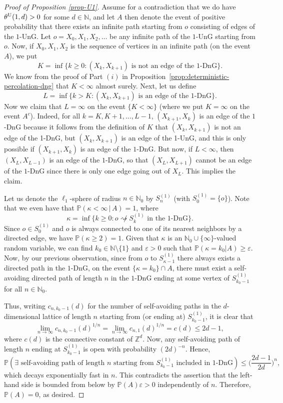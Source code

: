 \documentclass[a4paper, oneside, 11pt]{amsart}
\newcommand{\N}{\mathbb{N}}
\theoremstyle{definition}
\renewcommand{\P}{\mathbb{P}}
\newcommand{\1}{\mathbbm{1}}
\newcommand{\0}{\mathbf{o}}
\newcommand{\Z}{\mathbb{Z}}
\numberwithin{equation}{section}
\begin{document}
\begin{proof}[Proof of Proposition \ref{prop-U1}]
    Assume for a contradiction that we do have $\theta^{\rm U}(1,d)>0$ for some $d \in \N$, and let $A$ then denote the event of positive probability that there exists an infinite path starting from $o$ consisting of edges of the $1$-UnG. %
Let $o=X_0,X_1,X_2,\ldots$ be any infinite path of the $1$-UnG starting from $o$.
Now, if $X_0,X_1,X_2$ is the sequence of vertices in an infinite path (on the event $A$), we put
\[ K=\inf \{ k \geq 0 \colon (X_k,X_{k+1}) \text{ is not an edge of the $1$-DnG} \}. \]
We know from the proof of Part $(i)$ in Proposition~\ref{prop:deterministic-percolation-dng} that $K<\infty$ almost surely. Next, let us define
\[ L=\inf \{ k > K \colon 
(X_{k},X_{k+1})\text{ is an edge of the 1-DnG}\}. \]
Now we claim that $L=\infty$ on the event $\{ K<\infty\}$ (where we put $K=\infty$ on the event $A^c$). Indeed, for all $k=K,K+1,\ldots,L-1$, $(X_{k+1},X_k)$ is an edge of the $1$-DnG because it follows from the definition of $K$ that $(X_{k},X_{k+1})$ is not an edge of the 1-DnG, but $(X_k,X_{k+1})$ is an edge of the 1-UnG, and this is only possible if $(X_{k+1},X_k)$ is an edge of the $1$-DnG. But now, if $L<\infty$, then $(X_{L},X_{L-1})$ is an edge of the $1$-DnG, so that $(X_{L},X_{L+1})$ cannot be an edge of the $1$-DnG since there is only one edge going out of $X_L$. This implies the claim.

Let us denote the $\ell_1$-sphere of radius $n\in\N_0$ by $S^{(1)}_n$ (with $S^{(1)}_0=\{o\}$). Note that we even have that $\P(\kappa<\infty\,|\,A)=1$, where
\[ \kappa = \inf \big\{ k \geq 0 \colon o \not\rightsquigarrow S^{(1)}_k \text{ in the $1$-DnG} \big\}. \]
Since $o \in S_0^{(1)}$ and $o$ is always connected to one of its nearest neighbors by a directed edge, we have $\P(\kappa \geq 2)=1$.
Given that $\kappa$ is an $\N_0 \cup \{\infty\}$-valued random variable, we can find $k_0\in\N \setminus \{ 1 \}$ and $\varepsilon>0$ such that $\P(\kappa =  k_0 |A) \geq \varepsilon$.  Now, by our previous observation, since from $o$ to $S^{(1)}_{\kappa-1}$ there always exists a directed path in the $1$-DnG, 
on the event $\{ \kappa = k_0 \} \cap A$, there must exist a self-avoiding directed path of length $n$ in the $1$-DnG ending at some vertex of $S^{(1)}_{k_0-1}$  for all $n\in\N_0$. 

Thus, writing $c_{n,k_0-1}(d)$ for the number of self-avoiding paths in the $d$-dimensional lattice of length $n$ starting from (or ending at) $S^{(1)}_{k_0-1}$, it is clear that
\[ \lim_{n\to\infty} c_{n,k_0-1}(d)^{1/n} = \lim_{n\to\infty} c_{n,1}(d)^{1/n}=c(d) \leq 2d-1, \]
where $c(d)$ is the connective constant of $\Z^d$. Now, any self-avoiding path of length $n$ ending at $S^{(1)}_{k_0-1}$ is open with probability $(2d)^{-n}$. Hence,
\[ \P(\exists\text{ self-avoiding path of length $n$ starting from $S^{(1)}_{k_0-1}$ included in $1$-DnG}) \leq \Big( \frac{2d-1}{2d} \Big)^n, \]
which decays exponentially fast in $n$. This contradicts the assertion that the left-hand side is bounded from below by $\P(A)\varepsilon>0$ independently of $n$. Therefore, $\P(A)=0$, as desired.
\end{proof}
\end{document}
